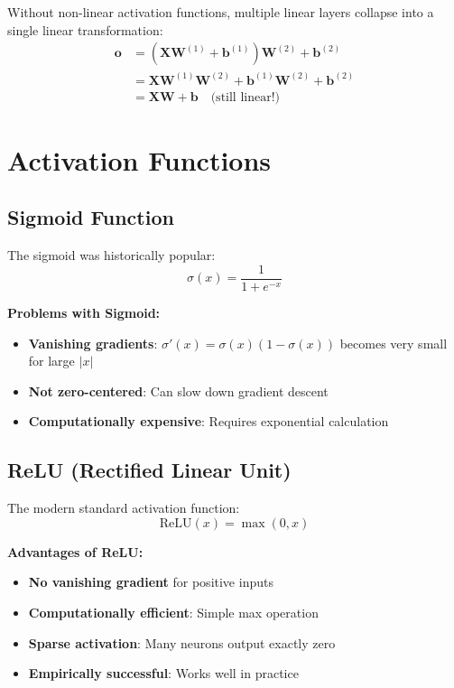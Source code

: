 \documentclass{article}
\begin{document}
\begin{tcolorbox}[colback=red!5!white, colframe=red!50!black, title=Why Non-linearity is Essential]
Without non-linear activation functions, multiple linear layers collapse into a single linear transformation:
\begin{align}
\mathbf{o} &= (\mathbf{X}\mathbf{W}^{(1)} + \mathbf{b}^{(1)})\mathbf{W}^{(2)} + \mathbf{b}^{(2)} \\
&= \mathbf{X}\mathbf{W}^{(1)}\mathbf{W}^{(2)} + \mathbf{b}^{(1)}\mathbf{W}^{(2)} + \mathbf{b}^{(2)} \\
&= \mathbf{X}\mathbf{W} + \mathbf{b} \quad \text{(still linear!)}
\end{align}
\end{tcolorbox}

\section{Activation Functions}

\subsection{Sigmoid Function}

The sigmoid was historically popular:
\[\sigma(x) = \frac{1}{1 + e^{-x}}\]

\textbf{Problems with Sigmoid:}
\begin{itemize}
    \item \textbf{Vanishing gradients}: $\sigma'(x) = \sigma(x)(1-\sigma(x))$ becomes very small for large $|x|$
    \item \textbf{Not zero-centered}: Can slow down gradient descent
    \item \textbf{Computationally expensive}: Requires exponential calculation
\end{itemize}

\subsection{ReLU (Rectified Linear Unit)}

The modern standard activation function:
\[\text{ReLU}(x) = \max(0, x)\]

\textbf{Advantages of ReLU:}
\begin{itemize}
    \item \textbf{No vanishing gradient} for positive inputs
    \item \textbf{Computationally efficient}: Simple max operation
    \item \textbf{Sparse activation}: Many neurons output exactly zero
    \item \textbf{Empirically successful}: Works well in practice
\end{itemize}
\end{document}
